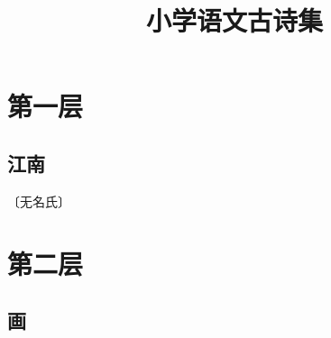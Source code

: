 \documentclass[12pt,UTF-8,openany]{ctexbook}
\title{\zihao{0} \bfseries 小学语文古诗集}
\author{}
\date{}
\begin{document}
\maketitle
\tableofcontents
\newpage

\chapter{第一层}

\section{江南}

\begin{center}
    \vspace{10pt}
    
    \begin{normalsize}
        
        〔无名氏〕
        
    \end{normalsize}
    
    \vspace{8pt}
    
    \begin{large}
        
        
        
        
        
        
        
        
    \end{large}
    
\end{center}

\vspace{8pt}


\chapter{第二层}

\section{画}
\end{document}
